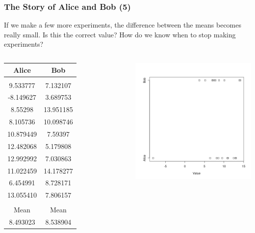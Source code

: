 \documentclass[10pt]{beamer}
\begin{document}
\begin{frame}
  \frametitle{The Story of Alice and Bob (5)}
  \begin{block}{}
    If we make a few more experiments, the difference between the
    means becomes really small. Is this the correct value? How do we
    know when to stop making experiments?
  \end{block}
  \begin{columns}[c]
    {\small
    \begin{tabular}{c|c}
      Alice & Bob \\
      \hline\\
      9.533777 & 7.132107\\
      -8.149627 & 3.689753\\
      8.55298 & 13.951185\\
      8.105736 & 10.098746\\
      10.879449 & 7.59397\\
      12.482068 & 5.179808\\
      12.992992 & 7.030863\\
      11.022459 & 14.178277\\
      6.454991 & 8.728171\\
      13.055410 & 7.806157\\      
      \hline
      \hline\\
      Mean & Mean\\
      8.493023 & 8.538904\\
    \end{tabular}}
    \includegraphics[width=1\textwidth]{img/AliceBob_10}
  \end{columns}
\end{frame}
\end{document}
